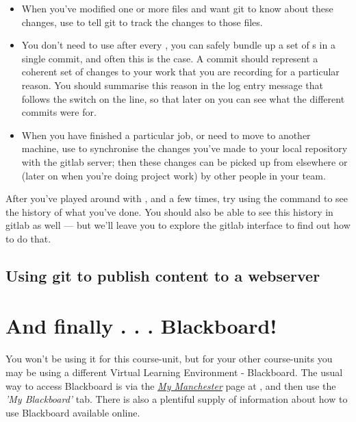 \begin{itemize}
\item When you've modified one or more files and want git to know about these changes, use  to tell git to track the changes to those files.

\item You don't need to use  after every ,
  you can safely bundle up a set of s in a single commit,
  and often this is the case. A commit should represent a coherent set
  of changes to your work that you are recording for a particular
  reason. You should summarise this reason in the log entry message
  that follows the  switch on the  line, so that
  later on you can see what the different commits were for.

\item When you have finished a particular job, or need to move to another machine, use  to synchronise the changes you've made to your local repository with the gitlab server; then these changes can be picked up from elsewhere or (later on when you're doing project work) by other people in your team. 
\end{itemize}

After you've played around with ,  and  a few times, try using the  command to see the history of what you've done. You should also be able to see this history in gitlab as well --- but we'll leave you to explore the gitlab interface to find out how to do that. 

\subsection{Using git to publish content to a webserver}



\section{And finally . . . Blackboard!}
\label{sec:blackboard}

You won't be using it for this course-unit, but for your other course-units you may be using a different Virtual Learning Environment - \textsf{Blackboard}. The usual way to access \textsf{Blackboard} is via the \href{https://my.manchester.ac.uk}{\emph{My Manchester}} page at , and then use the \emph{'My Blackboard'} tab. There is also a plentiful supply of information about how to use Blackboard available online.


